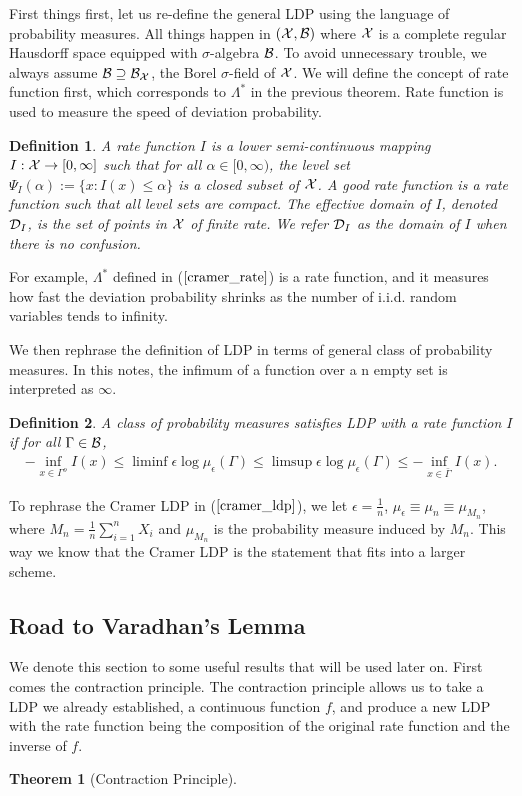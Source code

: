 \documentclass[10pt]{article}
\def\D{{\cal D}}
\def\X{{\cal X}}
\def\B{{\cal B}}
\newtheorem{definition}{\bf Definition}
\newtheorem{theorem}{\bf Theorem}
\newenvironment{Proof of lemma}{\noindent{\bf Proof of Lemma}}{\hfill$\Box$\newline}
\newenvironment{Proof of claim}{\noindent{\bf Proof of claim}}{\hfill$\Box$\newline}
\newenvironment{Proof of theorem}{\noindent{\bf Proof of Theorem}}{\hfill\scriptsize{$\Box$}\newline}
\newenvironment{Proof of theorems}{\noindent{\bf Proof of Theorems}}{\hfill$\Box$\newline}
\newenvironment{Proof of proposition}{\noindent{\bf Proof of Proposition}}{\hfill$\Box$\newline}
\newenvironment{Proof of propositions}{\noindent{\bf Proof of Propositions}}{\hfill$\Box$\newline}
\newenvironment{Proof of exercise}{\noindent{\it Proof of Exercise:}}{\hfill$\Box$}
\numberwithin{equation}{section}
\begin{document}
First things first, let us re-define the general LDP using the language of probability measures. All things happen in $(\X,\B)$ where $\X$ is a complete regular Hausdorff space equipped with $\sigma$-algebra $\B$. To avoid unnecessary trouble, we always assume $\B \supseteq \B_{\X}$, the Borel $\sigma$-field of $\X$. We will define the concept of rate function first, which corresponds to $\Lambda^{\ast}$ in the previous theorem. Rate function is used to measure the speed of deviation probability.
\begin{definition}
    A rate function $I$ is a lower semi-continuous mapping $I: \X \to [0,\infty]$ such that for all $\alpha \in [0,\infty)$, the level set $\Psi_I(\alpha) := \{x: I(x) \leq \alpha\}$ is a closed subset of $\X$. A good rate function is a rate function such that all level sets are compact. The effective domain of $I$, denoted $\D_I$, is the set of points in $\X$ of finite rate. We refer $\D_I$ as the domain of $I$ when there is no confusion.
\end{definition}
For example, $\Lambda^*$ defined in ($\ref{cramer_rate}$) is a rate function, and it measures how fast the deviation probability shrinks as the number of i.i.d. random variables tends to infinity.

We then rephrase the definition of LDP in terms of general class of probability measures. In this notes, the infimum of a function over a n empty set is interpreted as $\infty$.
\begin{definition}
    A class of probability measures satisfies LDP with a rate function $I$ if for all $\Gamma \in \B$,
    \begin{align} \label{ldp_bound}
        - \inf_{x \in \Gamma^o} I(x) \leq \liminf \epsilon \log \mu_{\epsilon}(\Gamma) \leq \limsup \epsilon \log \mu_{\epsilon}(\Gamma) \leq - \inf_{x \in \bar{\Gamma}} I(x).
    \end{align}
\end{definition}
To rephrase the Cramer LDP in ($\ref{cramer_ldp}$), we let $\epsilon = \frac{1}{n}$, $\mu_{\epsilon} \equiv \mu_n \equiv \mu_{M_n}$, where $M_n=\frac{1}{n}\sum_{i=1}^n X_i$ and $\mu_{M_n}$ is the probability measure induced by $M_n$. This way we know that the Cramer LDP is the statement that fits into a larger scheme.
\subsection{Road to Varadhan's Lemma}
We denote this section to some useful results that will be used later on. First comes the contraction principle. The contraction principle allows us to take a LDP we already established, a continuous function $f$, and produce a new LDP with the rate function being the composition of the original rate function and the inverse of $f$.
\begin{theorem}[Contraction Principle]
    
\end{theorem}
\end{document}
